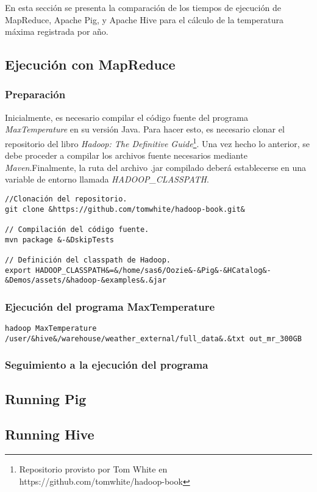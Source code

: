 En esta sección se presenta la comparación de los tiempos de ejecución de MapReduce, Apache Pig, y Apache Hive para el cálculo de la temperatura máxima registrada por año. 

\subsection{Ejecución con MapReduce}

\subsubsection{Preparación}

Inicialmente, es necesario compilar el código fuente del programa \textit{MaxTemperature} en su versión Java. Para hacer esto, es necesario clonar el repositorio del libro \textit{Hadoop: The Definitive Guide}\footnote{Repositorio provisto por Tom White en https://github.com/tomwhite/hadoop-book}. Una vez hecho lo anterior, se debe proceder a compilar los archivos fuente necesarios mediante \textit{Maven}.Finalmente, la ruta del archivo .jar compilado deberá establecerse en una variable de entorno llamada \textit{HADOOP\_CLASSPATH}. 

\begin{lstlisting}[linewidth=\columnwidth,breaklines=true]
//Clonación del repositorio.
git clone &https://github.com/tomwhite/hadoop-book.git&

// Compilación del código fuente.
mvn package &-&DskipTests

// Definición del classpath de Hadoop.
export HADOOP_CLASSPATH&=&/home/sas6/Oozie&-&Pig&-&HCatalog&-&Demos/assets/&hadoop-&examples&.&jar
\end{lstlisting}


\subsubsection{Ejecución del programa MaxTemperature}


\begin{lstlisting}[linewidth=\columnwidth,breaklines=true]
hadoop MaxTemperature /user/&hive&/warehouse/weather_external/full_data&.&txt out_mr_300GB
\end{lstlisting}

\subsubsection{Seguimiento a la ejecución del programa}


\subsection{Running Pig}

\subsection{Running Hive}